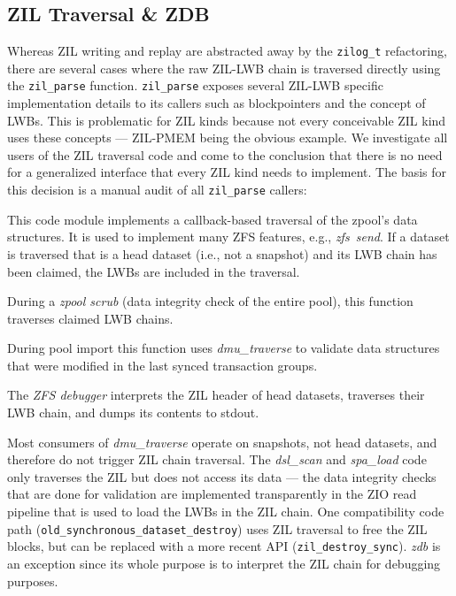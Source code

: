 \documentclass[12pt,a4paper,twoside]{book}
\begin{document}
\subsection{ZIL Traversal \& ZDB}\label{sec:zil_kinds:traversal}
Whereas ZIL writing and replay are abstracted away by the \lstinline{zilog_t} refactoring, there are several cases where the raw ZIL-LWB chain is traversed directly using the \lstinline{zil_parse} function.
\lstinline{zil_parse} exposes several ZIL-LWB specific implementation details to its callers such as blockpointers and the concept of LWBs.
This is problematic for ZIL kinds because not every conceivable ZIL kind uses these concepts --- ZIL-PMEM being the obvious example.
We investigate all users of the ZIL traversal code and come to the conclusion that there is no need for a generalized interface that every ZIL kind needs to implement.
The basis for this decision is a manual audit of all \lstinline{zil_parse} callers:
\begin{description}[noitemsep]
    \item[dmu\_traverse] This code module implements a callback-based traversal of the zpool's data structures.
    It is used to implement many ZFS features, e.g., \mbox{\textit{zfs send}}.
    If a dataset is traversed that is a head dataset (i.e., not a snapshot) and its LWB chain has been claimed, the LWBs are included in the traversal.
    \item[dsl\_scan\_zil] During a \textit{zpool scrub} (data integrity check of the entire pool), this function traverses claimed LWB chains.
    \item[spa\_load\_verify] During pool import this function uses \textit{dmu\_traverse} to validate data structures that were modified in the last synced transaction groups.
    \item[zdb\_il.c] The \textit{ZFS debugger} interprets the ZIL header of head datasets, traverses their LWB chain, and dumps its contents to stdout.
\end{description}
Most consumers of \textit{dmu\_traverse} operate on snapshots, not head datasets, and therefore do not trigger ZIL chain traversal.
The \textit{dsl\_scan} and \textit{spa\_load} code only traverses the ZIL but does not access its data --- the data integrity checks that are done for validation are implemented transparently in the ZIO read pipeline that is used to load the LWBs in the ZIL chain.
One compatibility code path (\lstinline{old_synchronous_dataset_destroy}) uses ZIL traversal to free the ZIL blocks, but can be replaced with a more recent API (\lstinline{zil_destroy_sync}).
\textit{zdb} is an exception since its whole purpose is to interpret the ZIL chain for debugging purposes.
\end{document}
